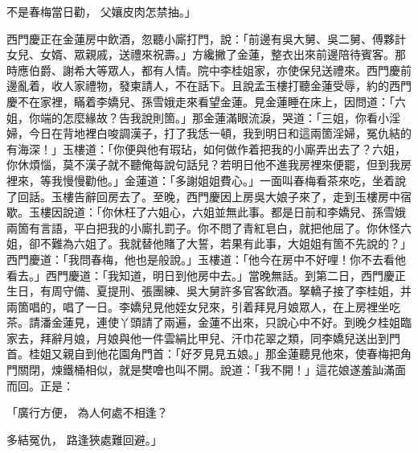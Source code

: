 不是春梅當日勸，  父孃皮肉怎禁抽。」

西門慶正在金蓮房中飲酒，忽聽小廝打門，說：「前邊有吳大舅、吳二舅、傅夥計女兒、女婿、眾親戚，送禮來祝壽。」方纔撇了金蓮，整衣出來前邊陪待賓客。那時應伯爵、謝希大等眾人，都有人情。院中李桂姐家，亦使保兒送禮來。西門慶前邊亂着，收人家禮物，發柬請人，不在話下。且說孟玉樓打聽金蓮受辱，約的西門慶不在家裡，瞞着李嬌兒、孫雪娥走來看望金蓮。見金蓮睡在床上，因問道：「六姐，你端的怎麼緣故？告我說則箇。」那金蓮滿眼流淚，哭道：「三姐，你看小淫婦，今日在背地裡白唆調漢子，打了我恁一頓，我到明日和這兩箇淫婦，冤仇結的有海深！」玉樓道：「你便與他有瑕玷，如何做作着把我的小廝弄出去了？六姐，你休煩惱，莫不漢子就不聽俺每說句話兒？若明日他不進我房裡來便罷，但到我房裡來，等我慢慢勸他。」金蓮道：「多謝姐姐費心。」一面叫春梅看茶來吃，坐着說了回話。玉樓告辭回房去了。至晚，西門慶因上房吳大娘子來了，走到玉樓房中宿歇。玉樓因說道：「你休枉了六姐心，六姐並無此事。都是日前和李嬌兒、孫雪娥兩箇有言語，平白把我的小廝扎罰子。你不問了青紅皂白，就把他屈了。你休怪六姐，卻不難為六姐了。我就替他賭了大誓，若果有此事，大姐姐有箇不先說的？」西門慶道：「我問春梅，他也是般說。」玉樓道：「他今在房中不好哩！你不去看他看去。」西門慶道：「我知道，明日到他房中去。」當晚無話。到第二日，西門慶正生日，有周守備、夏提刑、張團練、吳大舅許多官客飲酒。拏轎子接了李桂姐，并兩箇唱的，唱了一日。李嬌兒見他姪女兒來，引着拜見月娘眾人，在上房裡坐吃茶。請潘金蓮見，連使丫頭請了兩遍，金蓮不出來，只說心中不好。到晚夕桂姐臨家去，拜辭月娘，月娘與他一件雲絹比甲兒、汗巾花翠之類，同李嬌兒送出到門首。桂姐又親自到他花園角門首：「好歹見見五娘。」那金蓮聽見他來，使春梅把角門關閉，煉鐵桶相似，就是樊噲也叫不開。說道：「我不開！」這花娘遂羞訕滿面而回。正是：

「廣行方便，  為人何處不相逢？

多結冤仇，  路逢狹處難回避。」

